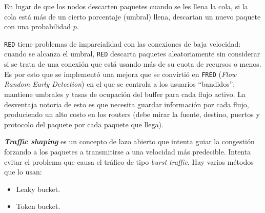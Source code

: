 \documentclass[]{article}
\begin{document}
En lugar de que los nodos descarten paquetes cuando se les llena la cola, si la cola está más de un cierto porcentaje (umbral) llena, descartan un nuevo paquete con una probabilidad $p$.

\texttt{RED} tiene problemas de imparcialidad con las conexiones de baja velocidad: cuando se alcanza el umbral, \texttt{RED} descarta paquetes aleatoriamente sin considerar si se trata de una conexión que está usando más de su cuota de recursos o menos. Es por esto que se implementó una mejora que se convirtió en \texttt{FRED} (\emph{Flow Random Early Detection}) en el que se controla a los usuarios ``bandidos'': mantiene umbrales y tasas de ocupación del buffer para cada flujo activo. La desventaja notoria de esto es que necesita guardar información por cada flujo, produciendo un alto costo en los routers (debe mirar la fuente, destino, puertos y protocolo del paquete por cada paquete que llega).

\emph{\textbf{Traffic shaping}} es un concepto de lazo abierto que intenta guiar la congestión forzando a los paquetes a transmitirse a una velocidad más predecible. Intenta evitar el problema que causa el tráfico de tipo \emph{burst traffic}. Hay varios métodos que lo usan:
\begin{itemize}
    \item Leaky bucket.
    \item Token bucket.
\end{itemize}




\end{document}
